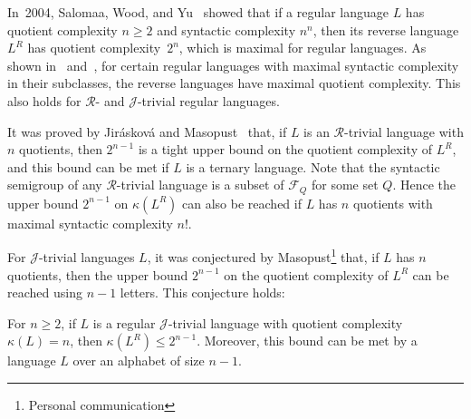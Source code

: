 \documentclass{llncs}
\renewcommand{\le}{\leqslant}
\renewcommand{\ge}{\geqslant}
\newcommand{\cF}{{\mathcal F}}
\newcommand{\gR}{{\mathcal R}}
\newcommand{\gJ}{{\mathcal J}}
\begin{document}
In~2004, Salomaa, Wood, and Yu~\cite{SWY04} showed that if a regular language $L$ has quotient complexity $n \ge 2$ and syntactic complexity $n^n$, then its reverse language $L^R$ has quotient complexity~$2^n$, which is maximal for regular languages. As shown in~\cite{BrYe11} and~\cite{BLY12}, for certain regular languages with maximal syntactic complexity in their subclasses, the reverse languages have maximal quotient complexity. This also holds for $\gR$- and $\gJ$-trivial regular languages. 

It was proved by Jir{\'a}skov{\'a} and Masopust~\cite{JiMa12} that, if $L$ is an $\gR$-trivial language with $n$ quotients, then $2^{n-1}$ is a tight upper bound on the quotient complexity of $L^R$, and this bound can be met if $L$ is a ternary language. Note that the syntactic semigroup of any $\gR$-trivial language is a subset of $\cF_Q$ for some set $Q$. Hence the upper bound $2^{n-1}$ on $\kappa(L^R)$ can also be reached if $L$ has $n$ quotients with maximal syntactic complexity $n!$. 


For $\gJ$-trivial languages $L$, it was conjectured by Masopust\footnote{Personal communication} that, if $L$ has $n$ quotients, then the upper bound $2^{n-1}$ on the quotient complexity of $L^R$ can be reached using $n-1$ letters. This conjecture holds:


\begin{theorem}\label{thm:Jrev}
For $n \ge 2$, if $L$ is a regular $\gJ$-trivial language with quotient complexity $\kappa(L) = n$, then $\kappa(L^R) \le 2^{n-1}$. Moreover, this bound can be met by a language $L$ over an alphabet of size $n-1$.
\end{theorem}
\end{document}

